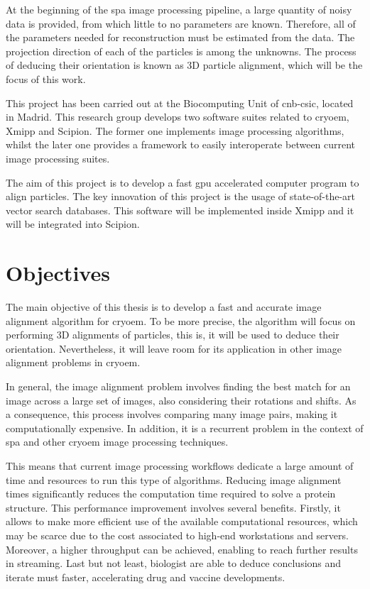 \documentclass[../main.tex]{subfiles}
\begin{document}
At the beginning of the \gls{spa} image processing pipeline, a large quantity of noisy data is provided, from which little to no parameters are known. Therefore, all of the parameters needed for reconstruction must be estimated from the data. The projection direction of each of the particles is among the unknowns. The process of deducing their orientation is known as 3D particle alignment, which will be the focus of this work.

This project has been carried out at the Biocomputing Unit of \gls{cnb}-\gls{csic}, located in Madrid. This research group develops two software suites related to \gls{cryoem}, Xmipp and Scipion. The former one implements image processing algorithms, whilst the later one provides a framework to easily interoperate between current image processing suites.

The aim of this project is to develop a fast \gls{gpu} accelerated computer program to align particles. The key innovation of this project is the usage of state-of-the-art vector search databases. This software will be implemented inside Xmipp and it will be integrated into Scipion.

\section{Objectives}
The main objective of this thesis is to develop a fast and accurate image alignment algorithm for \gls{cryoem}. To be more precise, the algorithm will focus on performing 3D alignments of particles, this is, it will be used to deduce their orientation. Nevertheless, it will leave room for its application in other image alignment problems in \gls{cryoem}.

In general, the image alignment problem involves finding the best match for an image across a large set of images, also considering their rotations and shifts. As a consequence, this process involves comparing many image pairs, making it computationally expensive. In addition, it is a recurrent problem in the context of \gls{spa} and other \gls{cryoem} image processing techniques.

This means that current image processing workflows dedicate a large amount of time and resources to run this type of algorithms. Reducing image alignment times significantly reduces the computation time required to solve a protein structure. This performance improvement involves several benefits. Firstly, it allows to make more efficient use of the available computational resources, which may be scarce due to the cost associated to high-end workstations and servers. Moreover, a higher throughput can be achieved, enabling to reach further results in streaming. Last but not least, biologist are able to deduce conclusions and iterate must faster, accelerating drug and vaccine developments.
\end{document}

